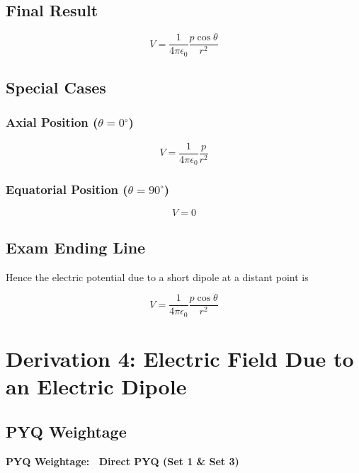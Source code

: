 \documentclass[11pt,a4paper]{article}
\begin{document}
\subsection*{Final Result}
\begin{tcolorbox}[colback=RoyalBlue!5!white, colframe=RoyalBlue]
    \[ V = \frac{1}{4\pi\epsilon_0} \frac{p\cos\theta}{r^2} \]
\end{tcolorbox}

\subsection*{Special Cases}
\subsubsection*{Axial Position (\( \theta = 0^\circ \))}
\begin{tcolorbox}[colback=RoyalBlue!5!white, colframe=RoyalBlue]
    \[ V = \frac{1}{4\pi\epsilon_0} \frac{p}{r^2} \]
\end{tcolorbox}

\subsubsection*{Equatorial Position (\( \theta = 90^\circ \))}
\begin{tcolorbox}[colback=RoyalBlue!5!white, colframe=RoyalBlue]
    \[ V = 0 \]
\end{tcolorbox}

\subsection*{Exam Ending Line}
Hence the electric potential due to a short dipole at a distant point is
\begin{tcolorbox}[colback=RoyalBlue!5!white, colframe=RoyalBlue]
    \[ V = \frac{1}{4\pi\epsilon_0} \frac{p\cos\theta}{r^2} \]
\end{tcolorbox}

\newpage

\section{Derivation 4: Electric Field Due to an Electric Dipole}

\subsection*{PYQ Weightage}
\begin{tcolorbox}[colback=yellow!10!white, colframe=orange, halign=center]
    \textbf{PYQ Weightage: \textasteriskcentered\textasteriskcentered\textasteriskcentered\textasteriskcentered\textasteriskcentered\ Direct PYQ (Set 1 \& Set 3)}
\end{tcolorbox}
\end{document}
